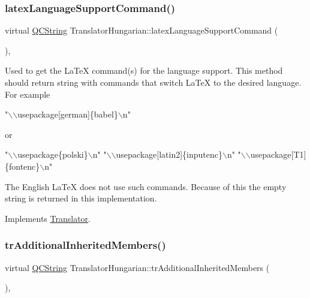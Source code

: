 \subsubsection{\texorpdfstring{latexLanguageSupportCommand()}{latexLanguageSupportCommand()}}
{\footnotesize\ttfamily virtual \mbox{\hyperlink{class_q_c_string}{Q\+C\+String}} Translator\+Hungarian\+::latex\+Language\+Support\+Command (\begin{DoxyParamCaption}{ }\end{DoxyParamCaption})\hspace{0.3cm}{\ttfamily [inline]}, {\ttfamily [virtual]}}

Used to get the La\+TeX command(s) for the language support. This method should return string with commands that switch La\+TeX to the desired language. For example 
\begin{DoxyPre}"\(\backslash\)\(\backslash\)usepackage[german]\{babel\}\(\backslash\)n"
 \end{DoxyPre}
 or 
\begin{DoxyPre}"\(\backslash\)\(\backslash\)usepackage\{polski\}\(\backslash\)n"
 "\(\backslash\)\(\backslash\)usepackage[latin2]\{inputenc\}\(\backslash\)n"
 "\(\backslash\)\(\backslash\)usepackage[T1]\{fontenc\}\(\backslash\)n"
 \end{DoxyPre}


The English La\+TeX does not use such commands. Because of this the empty string is returned in this implementation. 

Implements \mbox{\hyperlink{class_translator}{Translator}}.

\mbox{\label{class_translator_hungarian_a021cab24a5cf78286cd3ed5bd4f7740e}} 
\subsubsection{\texorpdfstring{trAdditionalInheritedMembers()}{trAdditionalInheritedMembers()}}
{\footnotesize\ttfamily virtual \mbox{\hyperlink{class_q_c_string}{Q\+C\+String}} Translator\+Hungarian\+::tr\+Additional\+Inherited\+Members (\begin{DoxyParamCaption}{ }\end{DoxyParamCaption})\hspace{0.3cm}{\ttfamily [inline]}, {\ttfamily [virtual]}}

